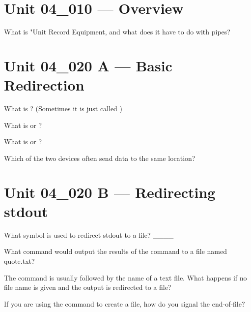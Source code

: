 \documentclass[letterpaper,12pt]{exam}
\newcommand{\unit}{Unit 04}
\begin{document}
\begin {questions}

\section*{\unit\_010 --- Overview} %

\begin{samepage}
	\question What is "Unit Record Equipment, and what does it have to do with pipes?
	\vspace{15mm}
\end{samepage}

\section*{\unit\_020 A --- Basic Redirection} %


	\question What is ? 
	(Sometimes it is just called )
	\vspace{5mm}

	\question What is  or ?
	\vspace{5mm}

	\question What is  or ?
	\vspace{5mm}

	\question Which of the two devices often send data to the same location?
	\vspace{5mm}
\section*{\unit\_020 B --- Redirecting stdout} %

\question What symbol is used to redirect stdout to a file? \_\_\_\_

\begin{samepage}
\question What command would output the results of the  command to a file named quote.txt?  
\vspace{5mm}
\end{samepage}

\begin{samepage}
\question The  command is usually followed by the name of a text file.  What happens 
if no file name is given and the output is redirected to a file? 
\vspace{15mm}

\question If you are using the  command to create a file, how do you
signal the end-of-file?  
\end{samepage}

\end{questions}
\end{document}
